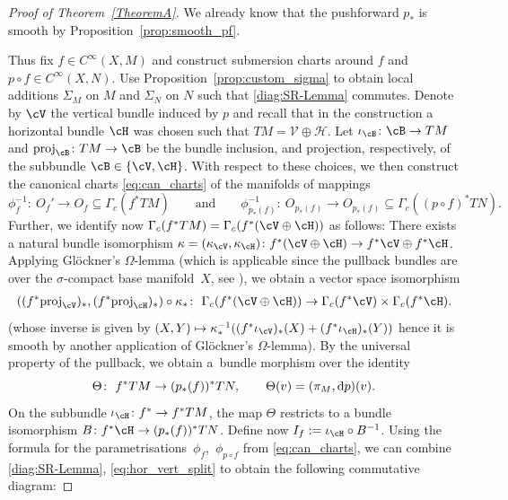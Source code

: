 \begin{proof}[Proof of Theorem~\ref{TheoremA}]
We already know that the pushforward $p_\ast$ is smooth by Proposition~\ref{prop:smooth_pf}.

Thus fix $f \in C^\infty (X,M)$ and construct submersion charts around $f$ and $p\circ f \in C^\infty (X,N)$. Use Proposition~\ref{prop:custom_sigma} to obtain local additions $\Sigma_M$ on $M$ and $\Sigma_N$ on $N$ such that \eqref{diag:SR-Lemma} commutes. Denote by $\cV$ the vertical bundle induced by $p$ and recall that in the construction a horizontal bundle $\cH$ was chosen such that $TM = \mathcal{V} \oplus \mathcal{H}$. Let $\iota_\cB \colon \cB \rightarrow TM$ and $\text{proj}_{\cB} \colon TM \rightarrow \cB$ be the bundle inclusion, and projection, respectively, of the subbundle $\cB \in \{\cV, \cH\}$.
With respect to these choices, we then construct the canonical charts \eqref{eq:can_charts} of the manifolds of mappings
\begin{displaymath}
 \phi_f^{-1} \colon\ O_f' \rightarrow O_f \subseteq \Gamma_c (f^{\ast}TM) \qquad\text{and}\qquad \phi_{p_\ast (f)}^{-1}\colon\ O_{p_\ast (f)} \rightarrow O_{p_\ast (f)}\subseteq \Gamma_c ((p\circ f)^\ast TN).
\end{displaymath}
Further, we identify now $\Gamma_c (f^\ast TM)=\Gamma_c (f^\ast (\cV\oplus \cH))$ as follows: There exists a natural bundle isomorphism $\kappa =(\kappa_\cV, \kappa_\cH) \colon f^\ast (\cV \oplus \cH) \rightarrow f^\ast \cV \oplus f^\ast \cH$. Applying Gl\"{o}ckner's $\Omega$-lemma \mbox{\cite[Theorem~F.23]{glo04}} (which is applicable since the pullback bundles are over the $\sigma$-compact base manifold~$X$, see \cite[Lemma F.19\,(c)]{glo04}), we obtain a vector space isomorphism
\begin{align}\label{eq:hor_vert_split}
((f^\ast \text{proj}_\cV)_\ast, (f^\ast \text{proj}_\cH)_\ast) \circ \kappa_\ast \colon\ \Gamma_c (f^\ast (\cV\oplus \cH))\rightarrow \Gamma_c(f^\ast \cV)\times \Gamma_c(f^\ast \cH).
\end{align}
(whose inverse is given by $ (X,Y) \mapsto \kappa^{-1}_\ast ((f^\ast \iota_\cV)_\ast (X) + (f^\ast \iota_{\cH})_\ast (Y))$ hence it is smooth by another application of Gl\"{o}ckner's $\Omega$-lemma).
By the universal property of the pullback, we obtain a~bundle morphism over the identity
\begin{displaymath}
 \Theta \colon\ f^\ast TM \rightarrow (p_\ast(f))^\ast TN,\qquad \Theta (v)=(\pi_M,{\rm d}p)(v).
\end{displaymath}
On the subbundle $\iota_{\cH}\colon f^\ast \rightarrow f^\ast TM$, the map $\Theta$ restricts to a bundle isomorphism $B\colon f^\ast \cH \rightarrow (p_\ast (f))^\ast TN$. Define now $I_f := \iota_{\cH} \circ B^{-1}$. Using the formula for the parametrisations~$\phi_f$,~$\phi_{p\circ f}$ from \eqref{eq:can_charts}, we can combine \eqref{diag:SR-Lemma}, \eqref{eq:hor_vert_split} to obtain the following commutative diagram:

\end{proof}
